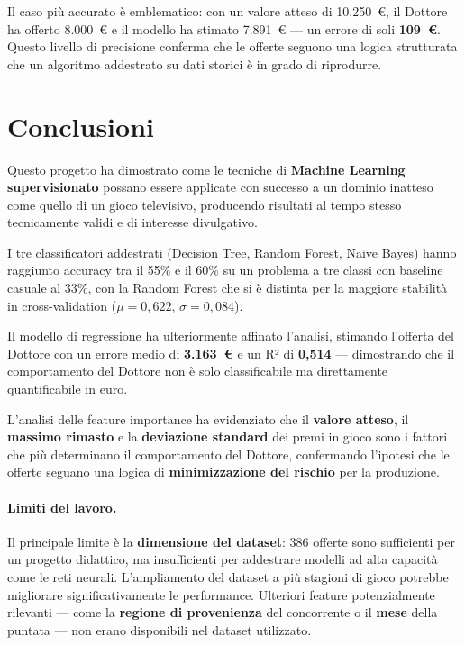 \documentclass[12pt, a4paper]{article}
\begin{document}
Il caso più accurato è emblematico: con un valore atteso di 10.250~€,
il Dottore ha offerto 8.000~€ e il modello ha stimato 7.891~€ —
un errore di soli \textbf{109~€}. Questo livello di precisione conferma
che le offerte seguono una logica strutturata che un algoritmo addestrato
su dati storici è in grado di riprodurre.

\section{Conclusioni}

Questo progetto ha dimostrato come le tecniche di \textbf{Machine Learning
supervisionato} possano essere applicate con successo a un dominio inatteso
come quello di un gioco televisivo, producendo risultati al tempo stesso
tecnicamente validi e di interesse divulgativo.

I tre classificatori addestrati (Decision Tree, Random Forest, Naive Bayes)
hanno raggiunto accuracy tra il 55\% e il 60\% su un problema a tre classi
con baseline casuale al 33\%, con la Random Forest che si è distinta per la
maggiore stabilità in cross-validation ($\mu = 0{,}622$, $\sigma = 0{,}084$).

Il modello di regressione ha ulteriormente affinato l'analisi, stimando
l'offerta del Dottore con un errore medio di \textbf{3.163~€} e un
R² di \textbf{0,514} — dimostrando che il comportamento del Dottore
non è solo classificabile ma direttamente quantificabile in euro.

L'analisi delle feature importance ha evidenziato che il \textbf{valore atteso},
il \textbf{massimo rimasto} e la \textbf{deviazione standard} dei premi in gioco
sono i fattori che più determinano il comportamento del Dottore, confermando
l'ipotesi che le offerte seguano una logica di \textbf{minimizzazione del
rischio} per la produzione.

\paragraph{Limiti del lavoro.}
Il principale limite è la \textbf{dimensione del dataset}: 386 offerte sono
sufficienti per un progetto didattico, ma insufficienti per addestrare modelli
ad alta capacità come le reti neurali. L'ampliamento del dataset a più stagioni
di gioco potrebbe migliorare significativamente le performance. Ulteriori
feature potenzialmente rilevanti — come la \textbf{regione di provenienza} del
concorrente o il \textbf{mese} della puntata — non erano disponibili nel
dataset utilizzato.
\end{document}
